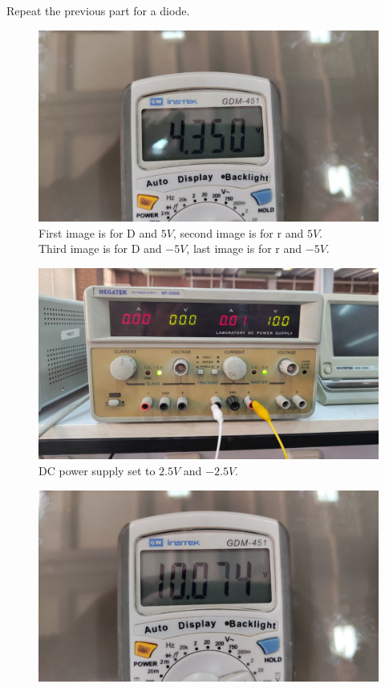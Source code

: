 \documentclass[11pt]{article}
\newcommand{\PicScale}{0.2}
\begin{document}
\begin{question}
\begin{subquestion}{Repeat the previous part for a diode.}
{\begin{figure}[H]
                \includegraphics[scale=0.08,angle=0]{Fig/34.jpeg}
                \caption{First image is for D and $5V$, second image is for r and $5V$. \\
                \hspace*{14mm} Third image is for D and $-5V$, last image is for r and $-5V$.}
            \end{figure}
            \begin{figure}[H]
                \centering
                \includegraphics[scale=\PicScale,angle=0]{Fig/35.jpeg}
                \caption{DC power supply set to $2.5V$ and $-2.5V$.}
            \end{figure}
            \begin{figure}[H]
                \centering
                \includegraphics[scale=0.08,angle=0]{Fig/36.jpeg}

\end{figure}}
\end{subquestion}
\end{question}
\end{document}
